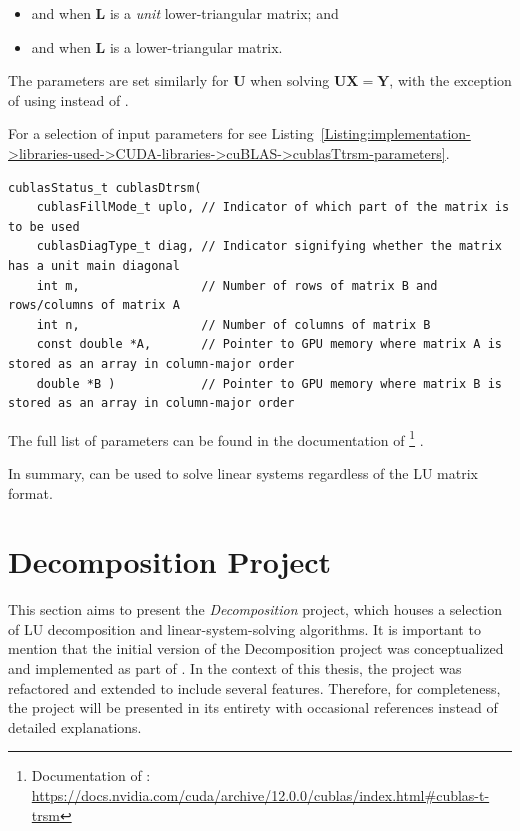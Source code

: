 \begin{itemize}
	\item {} and  when $\mathbf{L}$ is a \textit{unit} lower-triangular matrix; and
	\item {} and  when $\mathbf{L}$ is a lower-triangular matrix.
\end{itemize}

The parameters are set similarly for $\mathbf{U}$ when solving $\mathbf{UX}=\mathbf{Y}$, with the exception of using  instead of .

For a selection of input parameters for  see Listing~\ref{Listing:implementation->libraries-used->CUDA-libraries->cuBLAS->cublasTtrsm-parameters}.

\begin{lstlisting}[caption={The function declaration of \code{cublasDtrsm()} with a selection of parameters.},label={Listing:implementation->libraries-used->CUDA-libraries->cuBLAS->cublasTtrsm-parameters}]
cublasStatus_t cublasDtrsm(
	cublasFillMode_t uplo, // Indicator of which part of the matrix is to be used
	cublasDiagType_t diag, // Indicator signifying whether the matrix has a unit main diagonal
	int m,                 // Number of rows of matrix B and rows/columns of matrix A
	int n,                 // Number of columns of matrix B
	const double *A,       // Pointer to GPU memory where matrix A is stored as an array in column-major order
	double *B )            // Pointer to GPU memory where matrix B is stored as an array in column-major order
\end{lstlisting}

The full list of parameters can be found in the documentation of \footnote{Documentation of : \url{https://docs.nvidia.com/cuda/archive/12.0.0/cublas/index.html\#cublas-t-trsm}} \cite{h9oJtLLHaTFaL3ME}.

In summary,  can be used to solve linear systems regardless of the LU matrix format.




\section{Decomposition Project}\label{Section:implementation->decomposition-project}
This section aims to present the \textit{Decomposition} project,  which houses a selection of LU decomposition and linear-system-solving algorithms. It is important to mention that the initial version of the Decomposition project was conceptualized and implemented as part of  \cite{Cejka2022}. In the context of this thesis, the project was refactored and extended to include several features. Therefore, for completeness, the project will be presented in its entirety with occasional references instead of detailed explanations.

